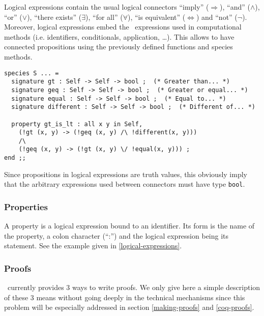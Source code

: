  Logical expressions contain the usual logical connectors ``imply''
($\Rightarrow$), ``and'' ($\wedge$), ``or'' ($\vee$), ``there exists''
($\exists$), ``for all'' ($\forall$), ``is equivalent''
($\Leftrightarrow$) and ``not'' ($\neg$). Moreover, logical
expressions embed the \focal\ expressions used in computational
methods (i.e. identifiers, conditionals, application, \ldots). This
allows to have connected propositions using the previously defined
functions and species methods.
{\scriptsize
\begin{lstlisting}
species S ... =
  signature gt : Self -> Self -> bool ;  (* Greater than... *)
  signature geq : Self -> Self -> bool ;  (* Greater or equal... *)
  signature equal : Self -> Self -> bool ;  (* Equal to... *)
  signature different : Self -> Self -> bool ;  (* Different of... *)

  property gt_is_lt : all x y in Self,
    (!gt (x, y) -> (!geq (x, y) /\ !different(x, y)))
    /\
    (!geq (x, y) -> (!gt (x, y) \/ !equal(x, y))) ;
end ;;
\end{lstlisting}
}
Since  propositions in logical expressions are truth values, this
obviously imply that the arbitrary expressions used between connectors
must have type {\tt bool}.



\subsubsection{Properties}
A property is  a logical expression bound to an identifier. Its
form is the name of the property, a colon character (``:'') and the
logical expression being its statement. See the example given in
\ref{logical-expressions}.
\begin{syn}
 \is
    \tok{:} 
\end{syn}





\subsubsection{Proofs}
\label{proof-short-intro}
\focal\ currently provides 3 ways to write proofs. We only give here a
simple description of these 3 means without going deeply in the
technical mechanisms since this problem will be especially addressed
in section \ref{making-proofs} and \ref{coq-proofs}. %


